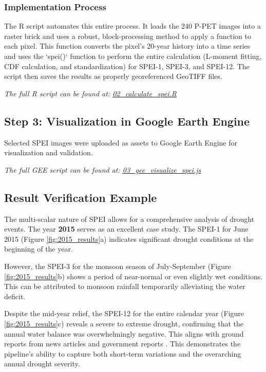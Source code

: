 \documentclass[12pt, a4paper]{article}
\begin{document}
\subsubsection{Implementation Process}
The R script automates this entire process. It loads the 240 P-PET images into a raster brick and uses a robust, block-processing method to apply a function to each pixel. This function converts the pixel's 20-year history into a time series and uses the `spei()` function to perform the entire calculation (L-moment fitting, CDF calculation, and standardization) for SPEI-1, SPEI-3, and SPEI-12. The script then saves the results as properly georeferenced GeoTIFF files.
\begin{center}
    \textit{The full R script can be found at: \href{https://github.com/Actuallyanonymous/spei-drought-analysis-pipeline/blob/main/scripts/02_calculate_spei.R}{02\_calculate\_spei.R}}
\end{center}

\subsection{Step 3: Visualization in Google Earth Engine}
Selected SPEI images were uploaded as assets to Google Earth Engine for visualization and validation.
\begin{center}
    \textit{The full GEE script can be found at: \href{https://github.com/Actuallyanonymous/spei-drought-analysis-pipeline/blob/main/scripts/03_gee_visualize_spei.js}{03\_gee\_visualize\_spei.js}}
\end{center}

\subsection{Result Verification Example}
The multi-scalar nature of SPEI allows for a comprehensive analysis of drought events. The year \textbf{2015} serves as an excellent case study. The SPEI-1 for June 2015 (Figure \ref{fig:2015_results}a) indicates significant drought conditions at the beginning of the year.

However, the SPEI-3 for the monsoon season of July-September (Figure \ref{fig:2015_results}b) shows a period of near-normal or even slightly wet conditions. This can be attributed to monsoon rainfall temporarily alleviating the water deficit.

Despite the mid-year relief, the SPEI-12 for the entire calendar year (Figure \ref{fig:2015_results}c) reveals a severe to extreme drought, confirming that the annual water balance was overwhelmingly negative. This aligns with ground reports from news articles \cite{sandrp2015} and government reports \cite{dpd2015}. This demonstrates the pipeline's ability to capture both short-term variations and the overarching annual drought severity.
\end{document}

